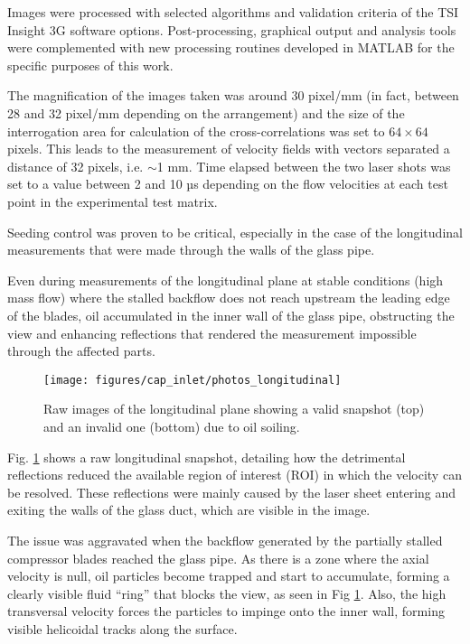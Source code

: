 Images were processed with selected algorithms and validation criteria of the TSI Insight 3G software options. Post-processing, graphical output and analysis tools were complemented with new processing routines developed in MATLAB for the specific purposes of this work.

The magnification of the images taken was around 30 pixel/mm (in fact, between 28 and 32 pixel/mm depending on the arrangement) and the size of the interrogation area for calculation of the cross-correlations was set to $64\times 64$ pixels. This leads to the measurement of velocity fields with vectors separated a distance of 32 pixels, i.e. $\sim$1 mm. Time elapsed between the two laser shots was set to a value between 2 and 10 µs depending on the flow velocities at each test point in the experimental test matrix.

Seeding control was proven to be critical, especially in the case of the longitudinal measurements that were made through the walls of the glass pipe.

Even during measurements of the longitudinal plane at stable conditions (high mass flow) where the stalled backflow does not reach upstream the leading edge of the blades, oil accumulated in the inner wall of the glass pipe, obstructing the view and enhancing reflections that rendered the measurement impossible through the affected parts.

\begin{figure}[!t]
\centering
\texttt{[image: figures/cap\_inlet/photos\_longitudinal]}
\caption{Raw images of the longitudinal plane showing a valid snapshot (top) and an invalid one (bottom) due to oil soiling.}
\label{fig:photos_longitudinal}
\end{figure}

Fig. \ref{fig:photos_longitudinal} shows a raw longitudinal snapshot, detailing how the detrimental reflections reduced the available region of interest (ROI) in which the velocity can be resolved. These reflections were mainly caused by the laser sheet entering and exiting the walls of the glass duct, which are visible in the image.

The issue was aggravated when the backflow generated by the partially stalled compressor blades reached the glass pipe. As there is a zone where the axial velocity is null, oil particles become trapped and start to accumulate, forming a clearly visible fluid ``ring'' that blocks the view, as seen in Fig \ref{fig:photos_longitudinal}. Also, the high transversal velocity forces the particles to impinge onto the inner wall, forming visible helicoidal tracks along the surface.

